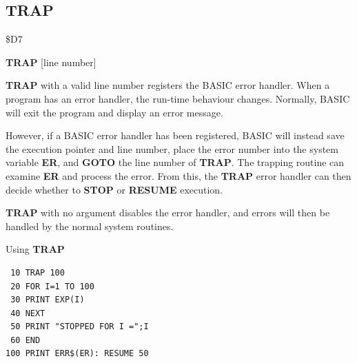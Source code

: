 \subsection{TRAP}
\begin{description}[leftmargin=2cm,style=nextline]
\item [Token:] \$D7
\item [Format:] {\bf TRAP} [line number]
\item [Usage:]  {\bf TRAP} with a valid line number registers the
                BASIC error handler. When a program has an error handler, the
                run-time behaviour changes. Normally, BASIC will exit the program
                and display an error message.

                However, if a BASIC error handler has been registered, BASIC will
                instead save the execution pointer and line number, place the
                error number into the system variable {\bf ER}, and {\bf GOTO}
                the line number of {\bf TRAP}. The trapping routine can examine
                {\bf ER} and process the error. From this, the {\bf TRAP} error
                handler can then decide whether to {\bf STOP} or {\bf RESUME} execution.

                {\bf TRAP} with no argument disables the error handler, and
                errors will then be handled by the normal system routines.

\item [Example:] Using {\bf TRAP}
\begin{tcolorbox}[colback=black,coltext=white]
\verbatimfont{\codefont}
\begin{verbatim}
 10 TRAP 100
 20 FOR I=1 TO 100
 30 PRINT EXP(I)
 40 NEXT
 50 PRINT "STOPPED FOR I =";I
 60 END
100 PRINT ERR$(ER): RESUME 50
\end{verbatim}
\end{tcolorbox}
\end{description}


\newpage
